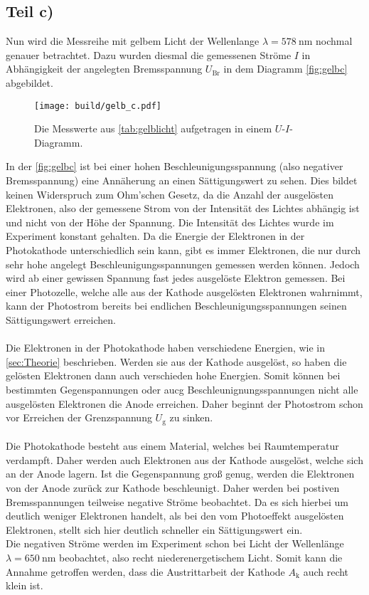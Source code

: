 \subsection{Teil c)}
Nun wird die Messreihe mit gelbem Licht der Wellenlange $\lambda = \SI{578}{\nano\metre}$ nochmal genauer betrachtet.
Dazu wurden diesmal die gemessenen Ströme $I$ in Abhängigkeit der angelegten Bremsspannung $U_{\text{Br}}$ in dem Diagramm \autoref{fig:gelbc} abgebildet.
\begin{figure}[H]
  \centering
  \texttt{[image: build/gelb\_c.pdf]}
  \caption{Die Messwerte aus \autoref{tab:gelblicht} aufgetragen in einem $U$-$I$- Diagramm.}
  \label{fig:gelbc}
\end{figure}
\noindent
In der \autoref{fig:gelbc} ist bei einer hohen Beschleunigungsspannung (also negativer Bremsspannung) eine Annäherung an einen Sättigungswert zu sehen.
Dies bildet keinen Widerspruch zum Ohm'schen Gesetz, da die Anzahl der ausgelösten Elektronen, also der gemessene Strom von der Intensität des Lichtes abhängig ist und nicht von der Höhe der Spannung.
Die Intensität des Lichtes wurde im Experiment konstant gehalten.
Da die Energie der Elektronen in der Photokathode unterschiedlich sein kann, gibt es immer Elektronen, die nur durch sehr hohe angelegt Beschleunigungsspannungen gemessen werden können.
Jedoch wird ab einer gewissen Spannung fast jedes ausgelöste Elektron gemessen.
Bei einer Photozelle, welche alle aus der Kathode ausgelösten Elektronen wahrnimmt,  kann der Photostrom bereits bei endlichen Beschleunigungsspannungen seinen Sättigungswert erreichen.\\
\\
Die Elektronen in der Photokathode haben verschiedene Energien, wie in \ref{sec:Theorie} beschrieben.
Werden sie aus der Kathode ausgelöst, so haben die gelösten Elektronen dann auch verschieden hohe Energien.
Somit können bei bestimmten Gegenspannungen oder aucg Beschleunignungsspannungen nicht alle ausgelösten Elektronen die Anode erreichen.
Daher beginnt der Photostrom schon vor Erreichen der Grenzspannung $U_{\text{g}}$ zu sinken. \\
\\
Die Photokathode besteht aus einem Material, welches bei Raumtemperatur verdampft.
Daher werden auch Elektronen aus der Kathode ausgelöst, welche sich an der Anode lagern.
Ist die Gegenspannung  groß genug, werden die Elektronen von der Anode zurück zur Kathode beschleunigt.
Daher werden bei postiven Bremsspannungen teilweise negative Ströme beobachtet.
Da es sich hierbei um deutlich weniger Elektronen handelt, als bei den vom Photoeffekt ausgelösten Elektronen, stellt sich hier deutlich schneller ein Sättigungswert ein.\\
Die negativen Ströme werden im Experiment schon bei Licht der Wellenlänge $\lambda = \SI{650}{\nano\metre}$ beobachtet, also recht niederenergetischem Licht.
Somit kann die Annahme  getroffen werden, dass die Austrittarbeit der Kathode $A_{\text{k}}$ auch recht klein ist.

